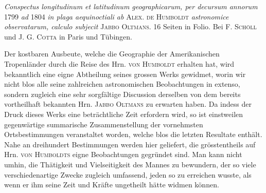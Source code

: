 \emph{Conspectus longitudinum et latitudinum geographicarum, per decursum annorum} 1799 \emph{ad} 1804 \emph{in plaga aequinoctiali ab} \textsc{Alex. de Humboldt} \emph{astronomice observatarum, calculo subjecit} \textsc{Jabbo Oltmans}. 16 Seiten in Folio. Bei \textsc{F. Schöll} und \textsc{J. G. Cotta} in Paris und Tübingen.

Der kostbaren Ausbeute, welche die Geographie der Amerikanischen Tropenländer durch die Reise des Hrn. \textsc{von Humboldt} erhalten hat, wird bekanntlich eine eigne Abtheilung seines grossen Werks gewidmet, worin wir nicht blos alle seine zahlreichen astronomischen Beobachtungen in extenso, sondern zugleich eine sehr sorgfältige Discussion derselben von dem bereits vortheilhaft bekannten Hrn. \textsc{Jabbo Oltmans} zu erwarten haben. Da indess der Druck dieses Werks eine beträchtliche Zeit erfordern wird, so ist einstweilen gegenwärtige summarische Zusammenstellung der vornehmsten Ortsbestimmungen veranstaltet worden, welche blos die letzten Resultate enthält. Nahe an dreihundert Bestimmungen werden hier geliefert, die grösstentheils auf Hrn. \textsc{von Humboldts} eigne Beobachtungen gegründet sind. Man kann nicht umhin, die Thätigkeit und Vielseitigkeit des Mannes zu bewundern, der so viele verschiedenartige Zwecke zugleich umfassend, jeden so zu erreichen wusste, als wenn er ihm seine Zeit und Kräfte ungetheilt hätte widmen können.
